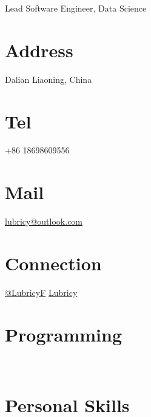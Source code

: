 \documentclass[]{lubricy-cv}
\begin{document}
      {Lead Software Engineer, Data Science}

\begin{aside}
  \section{Address}
    Dalian
    Liaoning, China
    ~
  \section{Tel}
    \faMobile+86 18698609556
    ~
  \section{Mail}
    \faEnvelopeO\href{mailto:lubricy@outlook.com}{ lubricy@outlook.com}
    ~
  \section{Connection}
    \faTwitter\href{https://twitter.com/LubricyF}{@LubricyF}
    \faGithub\href{https://github.com/Lubricy}{Lubricy}
    ~
  \section{Programming}
    ~
  \section{Personal Skills}
    ~

\end{aside}
\end{document}
